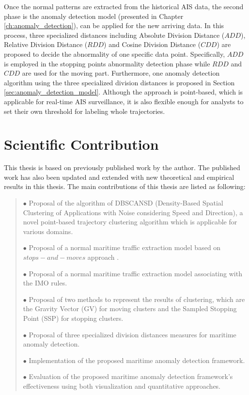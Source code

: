 \documentclass[12pt,glossary]{dalcsthesis}
\begin{document}
Once the normal patterns are extracted from the historical AIS data, the second phase is the anomaly detection model (presented in Chapter \ref{ch:anomaly_detection}), can be applied for the new arriving data. In this process, three specialized distances including Absolute Division Distance ($ADD$), Relative Division Distance ($RDD$) and Cosine Division Distance ($CDD$) are proposed to decide the abnormality of one specific data point. Specifically, $ADD$ is employed in the stopping points abnormality detection phase while $RDD$ and $CDD$ are used for the moving part. Furthermore, one anomaly detection algorithm using the three specialized division distances is proposed in Section \ref{sec:anomaly_detection_model}. Although the approach is point-based, which is applicable for real-time AIS surveillance, it is also flexible enough for analysts to set their own threshold for labeling whole trajectories.


\section{Scientific Contribution}

This thesis is based on previously published work by the author. The published
work has also been updated and extended with new theoretical and empirical
results in this thesis. The main contributions of this thesis are listed as following:

\begin{quote}
$\bullet$ Proposal of the algorithm of DBSCANSD (Density-Based Spatial Clustering of Applications with Noise considering Speed and Direction), a novel point-based trajectory clustering algorithm which is applicable for various domains.


$\bullet$ Proposal of a normal maritime traffic extraction model based on $stops-and-moves$ approach \cite{stopmove}. 

$\bullet$ Proposal of a normal maritime traffic extraction model associating with the IMO rules. 

$\bullet$ Proposal of two methods to represent the results of clustering, which are the Gravity Vector (GV) for moving clusters and the Sampled Stopping Point (SSP) for stopping clusters.

$\bullet$ Proposal of three specialized division distances measures for maritime anomaly detection.

$\bullet$ Implementation of the proposed maritime anomaly detection framework.

$\bullet$ Evaluation of the proposed maritime anomaly detection framework's effectiveness using both visualization and quantitative approaches.

\end{quote}
\end{document}
